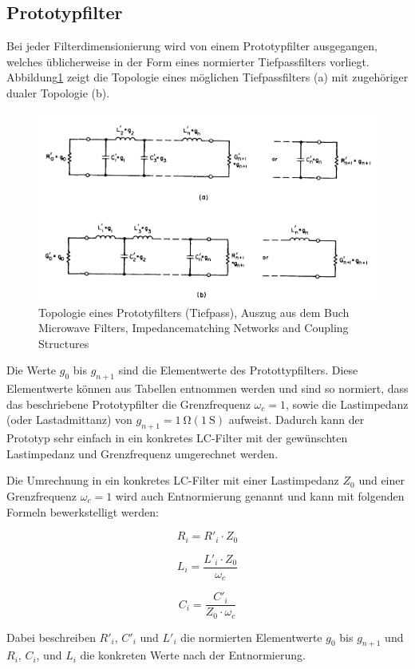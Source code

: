 \subsection{Prototypfilter}
\label{sec:Protototypfilter}

Bei jeder Filterdimensionierung  wird  von  einem  Prototypfilter ausgegangen,
welches üblicherweise in der Form eines  normierter  Tiefpassfilters vorliegt.
Abbildung\ref{fig:Prototyp_Filter}   zeigt   die   Topologie  eines  möglichen
Tiefpassfilters (a) mit zugehöriger dualer Topologie (b).

\begin{figure}[h!]
    \centering
 	\includegraphics[width=\imagewidth]{images/Prototyp_Filter.png}
 	\caption{Topologie eines Prototyfilters (Tiefpass), Auszug aus dem Buch Microwave Filters, Impedancematching Networks and Coupling Structures \cite[p.~95]{ref:matthaei} }
 	\label{fig:Prototyp_Filter}
\end{figure}

Die  Werte  $g_0$ bis $g_{n+1}$ sind die  Elementwerte  des  Protottypfilters.
Diese  Elementwerte können aus Tabellen entnommen werden und sind so normiert,
dass das beschriebene Prototypfilter die Grenzfrequenz  $\omega_c  = 1$, sowie
die    Lastimpedanz    (oder    Lastadmittanz)    von    $g_{n+1}=\SI{1}{\ohm}
(\SI{1}{\siemens})$  aufweist.  Dadurch kann der Prototyp sehr einfach in  ein
konkretes  LC-Filter  mit  der   gewünschten  Lastimpedanz  und  Grenzfrequenz
umgerechnet werden.

Die  Umrechnung in ein konkretes LC-Filter mit einer  Lastimpedanz  $Z_0$  und
einer Grenzfrequenz $\omega_c = 1$ wird auch Entnormierung  genannt  und  kann
mit folgenden Formeln bewerkstelligt werden:

\begin{equation}\label{eq:R}	
    R_i = R'_i \cdot Z_0
\end{equation}

\begin{equation}\label{eq:L}	
    L_i = \frac{L'_i \cdot Z_0}{\omega_c}
\end{equation}

\begin{equation}\label{eq:C}	
    C_i = \frac{C'_i}{Z_0 \cdot \omega_c}
\end{equation}

Dabei beschreiben $R'_i$, $C'_i$ und $L'_i$  die normierten Elementwerte $g_0$
bis $g_{n+1}$  und  $R_i$,  $C_i$,  und  $L_i$  die  konkreten  Werte nach der
Entnormierung.

